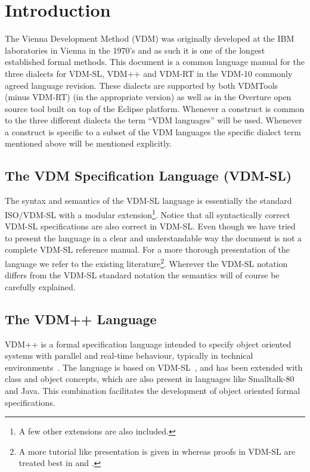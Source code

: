 \documentclass{overturerepchap}
\begin{document}
\tableofcontents
\newpage
\mbox{}
\newpage
{}
\setcounter{page}{1}

\chapter{Introduction}

The Vienna Development Method (VDM)
\cite{Bjorner&78,Jones90a,Fitzgerald&08c} was originally developed at
the IBM laboratories in Vienna in the 1970's and as such it is one of
the longest established formal methods.
This document is a common language manual for the three dialects for
VDM-SL, VDM++ and VDM-RT in the VDM-10 commonly agreed language
revision. These dialects  are supported by both VDMTools (minus VDM-RT)
\cite{Fitzgerald&08a} (in the appropriate version) as well as in the
Overture open source tool \cite{Larsen&10a} built on top of the
Eclipse platform. Whenever a construct is common to the three
different dialects the term ``VDM languages'' will be used. Whenever a
construct is specific to a subset of the VDM languages the specific
dialect term mentioned above will be mentioned explicitly.

\section{The VDM Specification Language (VDM-SL)}

The syntax and semantics of the VDM-SL
language is essentially the standard ISO/VDM-SL \cite{ISOVDM96}
with a modular extension\footnote{A few other extensions are also included.}.
Notice that all syntactically correct VDM-SL specifications are also correct in
 VDM-SL.
Even though we have tried to present the language in a
clear and understandable way the document is not a complete VDM-SL
reference manual.
For a more thorough presentation of the language we refer to the
existing literature\footnote{A more tutorial like
presentation is given in \cite{Fitzgerald&98b,Fitzgerald&09} whereas proofs in VDM-SL
are treated best in \cite{Jones90a} and \cite{Bicarregui&94}.}.
Wherever the  VDM-SL notation differs from
the VDM-SL standard notation the semantics will of course be carefully
explained.

\section{The VDM++ Language}

VDM++ is a formal specification language intended to specify object
oriented systems with parallel and real-time behaviour, typically in
technical environments~\cite{Fitzgerald&05}.  The language is based on
VDM-SL~\cite{ISOVDM96}, and has been extended with class and object
concepts, which are also present in languages like Smalltalk-80 and
Java.  This combination facilitates the development of object oriented
formal specifications.
\end{document}

